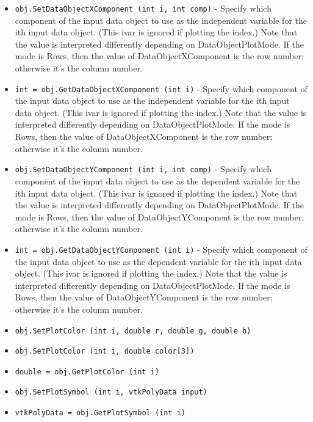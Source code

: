 \begin{itemize}
\item  \verb|obj.SetDataObjectXComponent (int i, int comp)| -  Specify which component of the input data object to use as the
 independent variable for the ith input data object. (This ivar is
 ignored if plotting the index.) Note that the value is interpreted
 differently depending on DataObjectPlotMode. If the mode is Rows, then
 the value of DataObjectXComponent is the row number; otherwise it's the
 column number.

\item  \verb|int = obj.GetDataObjectXComponent (int i)| -  Specify which component of the input data object to use as the
 independent variable for the ith input data object. (This ivar is
 ignored if plotting the index.) Note that the value is interpreted
 differently depending on DataObjectPlotMode. If the mode is Rows, then
 the value of DataObjectXComponent is the row number; otherwise it's the
 column number.

\item  \verb|obj.SetDataObjectYComponent (int i, int comp)| -  Specify which component of the input data object to use as the
 dependent variable for the ith input data object. (This ivar is
 ignored if plotting the index.) Note that the value is interpreted
 differently depending on DataObjectPlotMode. If the mode is Rows, then
 the value of DataObjectYComponent is the row number; otherwise it's the
 column number.

\item  \verb|int = obj.GetDataObjectYComponent (int i)| -  Specify which component of the input data object to use as the
 dependent variable for the ith input data object. (This ivar is
 ignored if plotting the index.) Note that the value is interpreted
 differently depending on DataObjectPlotMode. If the mode is Rows, then
 the value of DataObjectYComponent is the row number; otherwise it's the
 column number.

\item  \verb|obj.SetPlotColor (int i, double r, double g, double b)|

\item  \verb|obj.SetPlotColor (int i, double color[3])|

\item  \verb|double = obj.GetPlotColor (int i)|

\item  \verb|obj.SetPlotSymbol (int i, vtkPolyData input)|

\item  \verb|vtkPolyData = obj.GetPlotSymbol (int i)|


\end{itemize}
